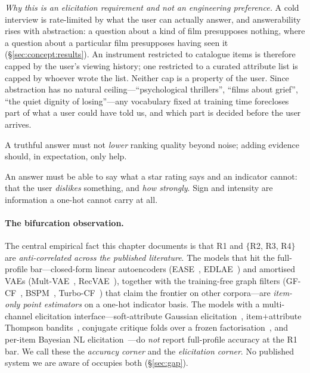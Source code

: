 \documentclass[11pt]{article}
\begin{document}
\begin{description}[leftmargin=2.4em,itemsep=1.5pt]
        \emph{Why this is an elicitation requirement and not an engineering preference.} A cold interview is rate-limited
        by what the user can actually answer, and answerability rises with abstraction: a question about a kind of
        film presupposes nothing, where a question about a particular film presupposes having seen it
        (\S\ref{sec:concept:results}). An instrument restricted to catalogue items is therefore capped by the user's
        viewing history; one restricted to a curated attribute list is capped by whoever wrote the list. Neither cap
        is a property of the user. Since abstraction has no natural ceiling---``psychological thrillers'', ``films
        about grief'', ``the quiet dignity of losing''---any vocabulary fixed at training time forecloses part of
        what a user could have told us, and which part is decided before the user arrives.
  \item[R3 --- monotonicity.] A truthful answer must not \emph{lower} ranking quality beyond noise; adding
        evidence should, in expectation, only help.
  \item[R4 --- expressive answers.] An answer must be able to say what a star rating says and an indicator cannot:
        that the user \emph{dislikes} something, and \emph{how strongly}. Sign and intensity are information a
        one-hot cannot carry at all.
\end{description}

\paragraph{The bifurcation observation.}
The central empirical fact this chapter documents is that R1 and $\{$R2, R3, R4$\}$ are \emph{anti-correlated across
the published literature}. The models that hit the full-profile bar---closed-form linear autoencoders
(EASE~\cite{steck2019ease}, EDLAE~\cite{steck2020edlae}) and amortised VAEs (Mult-VAE~\cite{liang2018variational},
RecVAE~\cite{ren2020recvae}), together with the training-free graph filters
(GF-CF~\cite{shen2021gfcf}, BSPM~\cite{choi2023bspm}, Turbo-CF~\cite{park2024turbocf}) that claim the frontier on other
corpora---are \emph{item-only point estimators} on a one-hot indicator basis. The models with a multi-channel elicitation interface---soft-attribute
Gaussian elicitation~\cite{biyik2023soft}, item$+$attribute Thompson bandits~\cite{li2021seamlessly}, conjugate critique
folds over a frozen factorisation~\cite{toroghi2023bcie}, and per-item Bayesian NL elicitation~\cite{austin2024bayesian}---do
\emph{not} report full-profile accuracy at the R1 bar. We call these the \emph{accuracy corner} and the
\emph{elicitation corner}. No published system we are aware of occupies both (\S\ref{sec:gap}).
\end{document}
